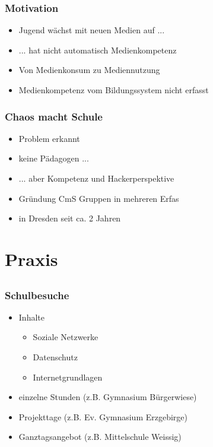 \documentclass[12pt]{beamer}
\begin{document}
\begin{frame}
  \frametitle{Motivation}
  \begin{itemize}
    \item<2-> Jugend wächst mit neuen Medien auf ...
    \item<3-> ... hat nicht automatisch Medienkompetenz
    \item<4-> Von Medienkonsum zu Mediennutzung
    \item<5-> Medienkompetenz vom Bildungssystem nicht erfasst
  \end{itemize}
\end{frame}

\begin{frame}
  \frametitle{Chaos macht Schule}
  \begin{itemize}
    \item<2-> Problem erkannt
    \item<3-> keine Pädagogen ...
    \item<4-> ... aber Kompetenz und Hackerperspektive
    \item<5-> Gründung CmS Gruppen in mehreren Erfas
    \item<6-> in Dresden seit ca. 2 Jahren
  \end{itemize}
\end{frame}

\section{Praxis}
\subsection{}

\begin{frame}
  \frametitle{Schulbesuche}
  \begin{itemize}
    \item<2-> Inhalte
    \begin{itemize}
      \item<3-> Soziale Netzwerke
      \item<4-> Datenschutz
      \item<5-> Internetgrundlagen
    \end{itemize}
    \item<6-> einzelne Stunden (z.B. Gymnasium Bürgerwiese)
    \item<7-> Projekttage (z.B. Ev. Gymnasium Erzgebirge)
    \item<8-> Ganztagsangebot (z.B. Mittelschule Weissig)
  \end{itemize}
\end{frame}
\end{document}
